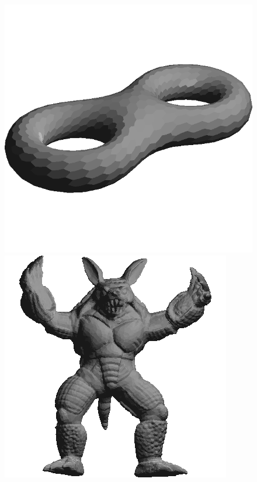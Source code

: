 \begin{figure}[!h]
    \endminipage\hfill
    \centering
    \includegraphics[scale=0.35]{images/eight-efs.png}
    \endminipage\hfill
    \centering
    \centering
    \includegraphics[scale=0.6]{images/armadillo-fs.png}
    \endminipage\hfill
    \centering
    \centering

\end{figure}
